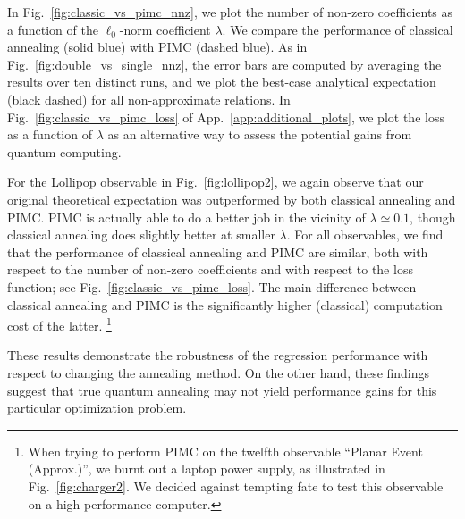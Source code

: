 \documentclass[aps,prd,twocolumn, superscriptaddress,preprintnumbers, nofootinbib,longbibliography,floatfix]{revtex4-2}
\DeclareRobustCommand{\App}[1]{App.~\ref{#1}}
\DeclareRobustCommand{\Fig}[1]{Fig.~\ref{#1}}
\begin{document}
In \Fig{fig:classic_vs_pimc_nnz}, we plot the number of non-zero coefficients as a function of the $\ell_0$-norm coefficient $\lambda$. 
%
We compare the performance of classical annealing (solid blue) with PIMC (dashed blue). 
%
As in \Fig{fig:double_vs_single_nnz}, the error bars are computed by averaging the results over ten distinct runs, and we plot the best-case analytical expectation (black dashed) for all non-approximate relations.
%
In \Fig{fig:classic_vs_pimc_loss} of \App{app:additional_plots}, we plot the loss as a function of $\lambda$ as an alternative way to assess the potential gains from quantum computing.


For the Lollipop observable in \Fig{fig:lollipop2}, we again observe that our original theoretical expectation was outperformed by both classical annealing and PIMC.
%
PIMC is actually able to do a better job in the vicinity of $\lambda \simeq 0.1$, though classical annealing does slightly better at smaller $\lambda$. 
%
For all observables, we find that the performance of classical annealing and PIMC are similar, both with respect to the number of non-zero coefficients and with respect to the loss function; see \Fig{fig:classic_vs_pimc_loss}.
%
The main difference between classical annealing and PIMC is the significantly higher (classical) computation cost of the latter.%
%
\footnote{\label{footnote:burnt}When trying to perform PIMC on the twelfth observable ``Planar Event (Approx.)'', we burnt out a laptop power supply, as illustrated in \Fig{fig:charger2}.  We decided against tempting fate to test this observable on a high-performance computer.}


These results demonstrate the robustness of the regression performance with respect to changing the annealing method.
%
On the other hand, these findings suggest that true quantum annealing may not yield performance gains for this particular optimization problem.
\end{document}
